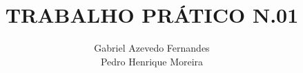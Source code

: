 \newcommand{\monog}{%
\uppercase{TRABALHO PRÁTICO N.01}
}
\title{\monog}
\newcommand{\por}{%
\centering
Gabriel Azevedo Fernandes \\
Pedro Henrique Moreira
}
\author{\por}

\newcommand{\univ}{\hspace{0.1cm}Pontifícia \hspace{0.1cm}Universidade\hspace{0.1cm} Católica \hspace{0.1cm}de\hspace{0.2cm} Minas\hspace{0.2cm} Gerais}

\newcommand{\curso}{\hspace{0.1cm} Curso de Graduação em Ciência da Computação}

\newcommand{\tipo}{Dissertação}

\newcommand{\profOrientador}{Zenilton Kleber Gonçalves}


\newcommand{\cidade}{Belo Horizonte}

\newcommand{\ano}{2024}

\newcommand{\dataCompleta}{14 de Abril de 2024}
